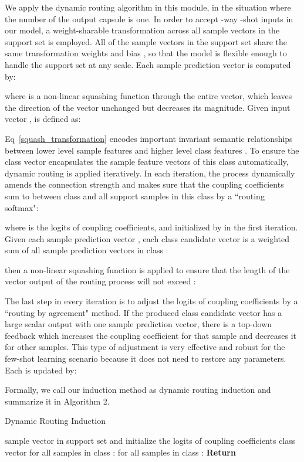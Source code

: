 \documentclass[11pt,a4paper]{article}
\begin{document}
We apply the dynamic routing algorithm \citep{sabour2017dynamic} in this module, in the situation where the number of the output capsule is one. 
In order to accept -way -shot inputs in our model, a weight-sharable transformation across all sample vectors in the support set is employed. All of the sample vectors in the support set share the same
transformation weights  and bias , so that the model is flexible enough to handle the support set at any scale. Each sample prediction vector  is computed by:

where  is a non-linear squashing function through the entire vector, which leaves the direction of the vector unchanged but decreases its magnitude. Given input vector ,  is defined as:

Eq~\ref{squash_transformation} encodes important invariant semantic relationships between lower level sample features and higher level class features \citep{hinton2011transforming}.
To ensure the class vector encapsulates the sample feature vectors of this class automatically, dynamic routing is applied iteratively. In each iteration, the process dynamically amends the connection strength and makes sure that the coupling coefficients  sum to  between class  and all support samples in this class by a ``routing softmax":

where  is the logits of coupling coefficients, and initialized by  in the first iteration. 
Given each sample prediction vector , each class candidate vector  is a weighted sum of all sample prediction vectors  in class :

then a non-linear squashing function is applied to ensure that the length of the vector output of the routing process will not exceed :


The last step in every iteration is to adjust the logits of coupling coefficients  by a ``routing by agreement" method. If the produced class candidate vector has a large scalar output with one sample prediction vector, there is a top-down feedback which increases the coupling coefficient for that sample and decreases it for other samples. This type of adjustment is very effective and robust for the few-shot learning scenario because it does not need to restore any parameters. Each  is updated by:


Formally, we call our induction method as dynamic routing induction and summarize it in Algorithm 2.
\begin{algorithm}[t]
\caption{Dynamic Routing Induction}
\begin{algorithmic}[1]
\REQUIRE sample vector  in support set  and initialize the logits of coupling coefficients 
\ENSURE class vector 
\STATE for all samples  in class :
\STATE 
{}
\STATE 
\STATE 
\STATE 
\STATE for all samples  in class :
\STATE 
\ENDFOR
\STATE \textbf{Return} 
\label{induction algorithm_alg}
\end{algorithmic}
\end{algorithm}
\end{document}
